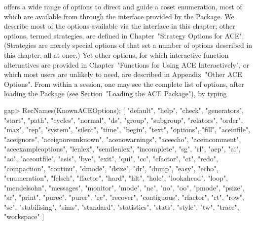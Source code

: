 

{\ACE} offers a wide range of options to  direct  and  guide  a  coset
enumeration, most of which  are  available  from  {\GAP}  through  the
interface provided by the {\ACE} Package.  We  describe  most  of  the
options available via the interface in this  chapter;  other  options,
termed strategies, are defined in Chapter~"Strategy Options for  ACE".
(Strategies are merely special options of {\ACE} that set a number  of
options described in this chapter, all at once.)  Yet  other  options,
for  which  interactive  function   alternatives   are   provided   in
Chapter~"Functions for Using ACE Interactively", or which most  {\GAP}
users are unlikely to  need,  are  described  in  Appendix~"Other  ACE
Options". From within a {\GAP} session, one may see the complete  list
of  {\ACE}  options,   after   loading   the   {\ACE}   Package   (see
Section~"Loading the ACE Package"), by typing

\beginexample
gap> RecNames(KnownACEOptions);
[ "default", "help", "check", "generators", "start", "path", "cycles", 
  "normal", "ds", "group", "subgroup", "relators", "order", "max", "rep", 
  "system", "silent", "time", "begin", "text", "options", "fill", 
  "aceinfile", "aceignore", "aceignoreunknown", "acenowarnings", "aceecho", 
  "aceincomment", "aceexampleoptions", "lenlex", "semilenlex", "incomplete", 
  "sg", "rl", "aep", "ai", "ao", "aceoutfile", "asis", "bye", "exit", "qui", 
  "cc", "cfactor", "ct", "redo", "compaction", "continu", "dmode", "dsize", 
  "dr", "dump", "easy", "echo", "enumeration", "felsch", "ffactor", "hard", 
  "hlt", "hole", "lookahead", "loop", "mendelsohn", "messages", "monitor", 
  "mode", "nc", "no", "oo", "pmode", "psize", "sr", "print", "purec", 
  "purer", "rc", "recover", "contiguous", "rfactor", "rt", "row", "sc", 
  "stabilising", "sims", "standard", "statistics", "stats", "style", "tw", 
  "trace", "workspace" ]

